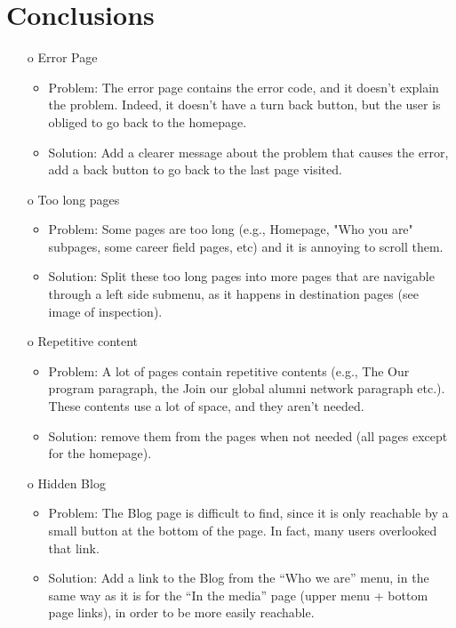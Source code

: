 \documentclass[11pt, letterpaper]{article}
\begin{document}
\section{Conclusions}
\begin{enumerate}
    \item[o] Error Page
        \begin{itemize}
            \item Problem: The error page contains the error code, and it doesn't explain the problem. Indeed, it doesn’t have a turn back button, but the user is obliged to go back to the homepage.
            \item Solution: Add a clearer message about the problem that causes the error, add a back button to go back to the last page visited.
        \end{itemize}
    \item[o] Too long pages
        \begin{itemize}
            \item Problem: Some pages are too long (e.g., Homepage, "Who you are" subpages, some career field pages, etc) and it is annoying to scroll them.
            \item Solution: Split these too long pages into more pages that are navigable through a left side submenu, as it happens in destination pages (see image of inspection).
        \end{itemize}
    \item[o] Repetitive content
        \begin{itemize}
            \item Problem: A lot of pages contain repetitive contents (e.g., The Our program paragraph, the Join our global alumni network paragraph etc.). These contents use a lot of space, and they aren’t needed.
            \item Solution: remove them from the pages when not needed (all pages except for the homepage).
        \end{itemize}
    \item[o] Hidden Blog
        \begin{itemize}
            \item Problem: The Blog page is difficult to find, since it is only reachable by a small button at the bottom of the page. In fact, many users overlooked that link.
            \item Solution: Add a link to the Blog from the “Who we are” menu, in the same way as it is for the “In the media” page (upper menu + bottom page links), in order to be more easily reachable. 

\end{itemize}
\end{enumerate}
\end{document}

